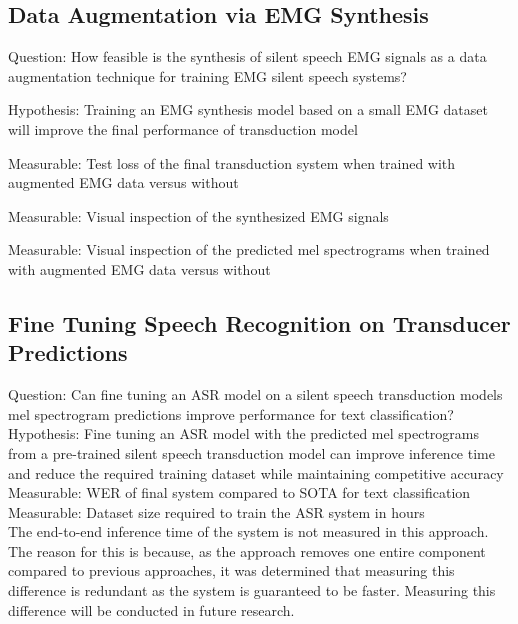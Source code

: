 \subsection{Data Augmentation via EMG Synthesis}

Question: How feasible is the synthesis of silent speech EMG signals
as a data augmentation technique for training EMG silent speech systems?

Hypothesis: Training an EMG synthesis model based on a small
EMG dataset will improve the final performance of transduction model

Measurable: Test loss of the final transduction system when trained
with augmented EMG data versus without

Measurable: Visual inspection of the synthesized EMG signals

Measurable: Visual inspection of the predicted mel spectrograms when
trained with augmented EMG data versus without

\subsection{Fine Tuning Speech Recognition on Transducer Predictions }

Question: Can fine tuning an ASR model on a silent speech
transduction models mel spectrogram predictions improve performance for
text classification? \\

Hypothesis: Fine tuning an ASR model with the predicted
mel spectrograms from a pre-trained silent speech transduction model
can improve inference time and reduce the required training dataset
while maintaining competitive accuracy \\

Measurable: WER of final system compared to SOTA for text classification \\
Measurable: Dataset size required to train the ASR system in hours \\

The end-to-end inference time of the system is not measured in this
approach. The reason for this is because, as the approach removes one
entire component compared to previous approaches, it was determined that
measuring this difference is redundant as the system is guaranteed
to be faster. Measuring this difference will be conducted in future
research.